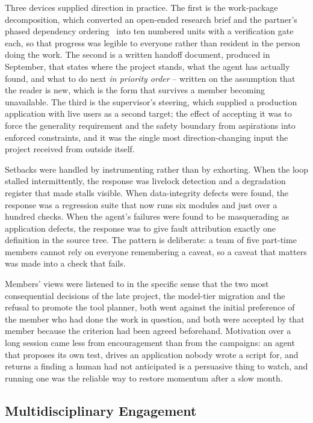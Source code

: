 Three devices supplied direction in practice. The first is the work-package
decomposition, which converted an open-ended research brief and the partner's
phased dependency ordering~\cite{etatr} into ten numbered units with a
verification gate each, so that progress was legible to everyone rather than
resident in the person doing the work. The second is a written handoff
document, produced in September, that states where the project stands, what the
agent has actually found, and what to do next \emph{in priority order} --
written on the assumption that the reader is new, which is the form that
survives a member becoming unavailable. The third is the supervisor's steering,
which supplied a production application with live users as a second target; the
effect of accepting it was to force the generality requirement and the safety
boundary from aspirations into enforced constraints, and it was the single
most direction-changing input the project received from outside itself.

Setbacks were handled by instrumenting rather than by exhorting. When the loop
stalled intermittently, the response was livelock detection and a degradation
register that made stalls visible. When data-integrity defects were found, the
response was a regression suite that now runs six modules and just over a
hundred checks. When the agent's failures were found to be masquerading as
application defects, the response was to give fault attribution exactly one
definition in the source tree. The pattern is deliberate: a team of five
part-time members cannot rely on everyone remembering a caveat, so a caveat that
matters was made into a check that fails.

Members' views were listened to in the specific sense that the two most
consequential decisions of the late project, the model-tier migration and the
refusal to promote the tool planner, both went against the initial preference of
the member who had done the work in question, and both were accepted by that
member because the criterion had been agreed beforehand. Motivation over a long
session came less from encouragement than from the campaigns: an agent that
proposes its own test, drives an application nobody wrote a script for, and
returns a finding a human had not anticipated is a persuasive thing to watch,
and running one was the reliable way to restore momentum after a slow month.

\subsection{Multidisciplinary Engagement}
\label{sec:multidisciplinary}

